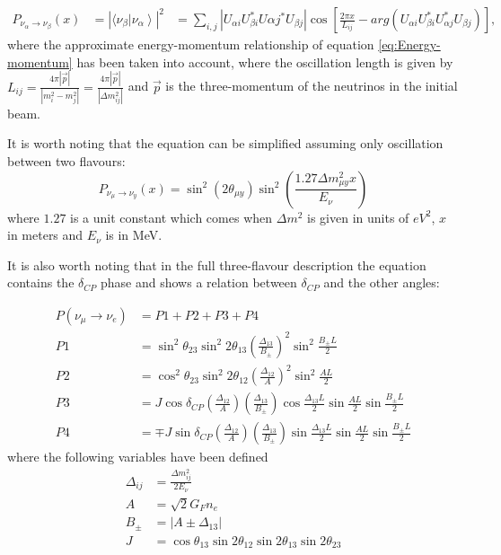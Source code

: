 \begin{equation}
\label{eq:Problength}
\begin{aligned}
P_{\nu_\alpha \rightarrow \nu_\beta} (x) &= \left|  \langle \nu_\beta \left| \nu_\alpha     \right\rangle  \right|^2
& = \sum_{i,j} \left| U_{\alpha i} U_{\beta i}^* U{\alpha j}^* U_{\beta j} \right| \cos\left[\frac{2\pi x}{L_{ij}} -arg(U_{\alpha i} U_{\beta i}^* U_{\alpha j}^* U_{\beta j} ) \right],
\end{aligned}
\end{equation}
where the approximate energy-momentum relationship of equation \ref{eq:Energy-momentum} has been taken into account, where the oscillation length is given by $L_{ij} = \frac{4\pi  \left| \vec{p} \right| }{\left| m_i^2 - m_j^2 \right|}=\frac{4\pi  \left| \vec{p} \right| }{\left| \Delta m_{ij}^2 \right|} $ and $\vec{p}$ is the three-momentum of the neutrinos in the initial beam.

It is worth noting that the equation can be simplified assuming only oscillation between two flavours:
\begin{equation}
P_{\nu_\mu \rightarrow \nu_y} (x) = \sin^2(2\theta_{\mu y})\sin^2 \left( \frac{1.27\Delta m_{\mu y}^2 x}{E_\nu} \right)
\label{eq:twoPNeutrinoosc}
\end{equation}
where $1.27$ is a unit constant which comes when $\Delta m^2$ is given in units of $eV^2$, $x$ in meters and $E_\nu$ is in MeV.

It is also worth noting that in the full three-flavour description the equation contains the $\delta_{CP}$ phase and shows a relation between $\delta_{CP}$ and the other angles:

\begin{align}
P(\nu_\mu \rightarrow \nu_e) &= P1 + P2 + P3 + P4 \label{eq:alignThreeFlavour}\\
P1 &= \sin^2 \theta_{23} \sin^2 2\theta_{13} (\frac{\Delta_{13}}{B_\pm})^2 \sin^2 \frac{B_\pm L}{2} \\
P2 &= \cos^2 \theta_{23} \sin^2 2\theta_{12} (\frac{\Delta_{12}}{A})^2 \sin^2 \frac{A L}{2} \\
P3 &= J\cos \delta_{CP} (\frac{\Delta_{12}}{A})(\frac{\Delta_{13}}{B_\pm})\cos \frac{\Delta_{13} L}{2}\sin \frac{A L}{2}\sin \frac{B_\pm L}{2} \\
P4 &= \mp J\sin \delta_{CP} (\frac{\Delta_{12}}{A})(\frac{\Delta_{13}}{B_\pm})\sin \frac{\Delta_{13} L}{2}\sin \frac{A L}{2}\sin \frac{B_\pm L}{2}
\end{align}
where the following variables have been defined
\begin{align}
\Delta_{ij} &= \frac{\Delta m^2_{ij}}{2E_\nu} \\
A &= \sqrt{2} G_F n_e \\
B_\pm &= | A \pm \Delta_{13} | \\
J &= \cos\theta_{13}\sin 2\theta_{12}\sin 2\theta_{13}\sin 2\theta_{23}
\end{align}


